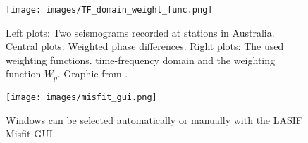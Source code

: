 \begin{figure}[h]
\begin{center}
\texttt{[image: images/TF\_domain\_weight\_func.png]}
\caption{Left plots: Two seismograms recorded at stations in Australia.
Central plots: Weighted phase differences.
Right plots: The used weighting functions.
time-frequency domain and the weighting function $W_p$. Graphic from \citealp{Fichtner2009}.}
\label{weight_func}
\end{center}
\end{figure}

\begin{figure}[h]
\begin{center}
\texttt{[image: images/misfit\_gui.png]}
\caption{Windows can be selected automatically or manually with the LASIF Misfit GUI.}
\label{misfit_gui}
\end{center}
\end{figure}





%
%






